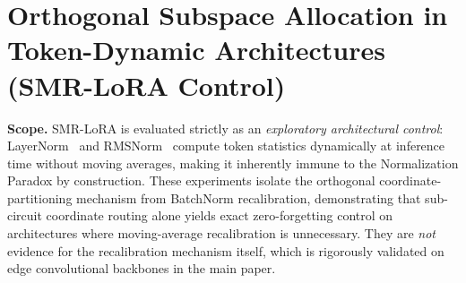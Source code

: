 \documentclass{article}
\begin{document}
\begin{table}[ht]
\centering
\caption{\textbf{Systematic Component Ablations on Split CIFAR-10.}}
\label{tab:systematic_ablation}
\end{table}


\section{Orthogonal Subspace Allocation in Token-Dynamic Architectures (SMR-LoRA Control)}
\label{sec:app_vit_transformers}
\label{sec:app_vit}
\label{sec:app_smr_lora}

\noindent\textbf{Scope.} SMR-LoRA is evaluated strictly as an \emph{exploratory architectural control}: LayerNorm~\cite{ba2016layer} and RMSNorm~\cite{zhang2019root} compute token statistics dynamically at inference time without moving averages, making it inherently immune to the Normalization Paradox by construction. These experiments isolate the orthogonal coordinate-partitioning mechanism from BatchNorm recalibration, demonstrating that sub-circuit coordinate routing alone yields exact zero-forgetting control on architectures where moving-average recalibration is unnecessary. They are \emph{not} evidence for the recalibration mechanism itself, which is rigorously validated on edge convolutional backbones in the main paper.
\end{document}
